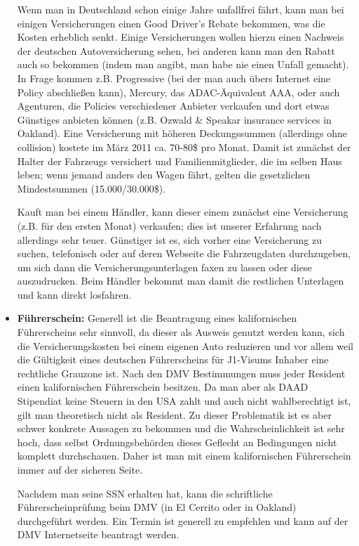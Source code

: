 \documentclass[a4paper]{scrreprt}
\begin{document}
\begin{itemize}
	Wenn man in Deutschland schon einige Jahre unfallfrei fährt, kann man bei einigen Versicherungen einen Good Driver's Rebate bekommen, was die Kosten erheblich senkt. Einige Versicherungen wollen hierzu einen Nachweis der deutschen Autoversicherung sehen, bei anderen kann man den Rabatt auch so bekommen (indem man angibt, man habe nie einen Unfall gemacht). In Frage kommen z.B. Progressive (bei der man auch übers Internet eine Policy abschließen kann), Mercury, das ADAC-Äquivalent AAA, oder auch Agenturen, die Policies verschiedener Anbieter verkaufen und dort etwas Günstiges anbieten können (z.B. Ozwald \& Speakar insurance services in Oakland). Eine Versicherung mit höheren Deckungssummen (allerdings ohne collision) kostete im März 2011 ca. 70-80\$ pro Monat. Damit ist zunächst der Halter der Fahrzeugs versichert und Familienmitglieder, die im selben Haus leben; wenn jemand anders den Wagen fährt, gelten die gesetzlichen Mindestsummen (15.000/30.000\$).
	
Kauft man bei einem Händler, kann dieser einem zunächst eine Versicherung (z.B. für den ersten Monat) verkaufen; dies ist unserer Erfahrung nach allerdings sehr teuer. Günstiger ist es, sich vorher eine Versicherung zu suchen, telefonisch oder auf deren Webseite die Fahrzeugdaten durchzugeben, um sich dann die Versicherungsunterlagen faxen zu lassen oder diese auszudrucken. Beim Händler bekommt man damit die restlichen Unterlagen und kann direkt losfahren.

	\item \textbf{Führerschein:} 
Generell ist die Beantragung eines kalifornischen Führerscheins sehr sinnvoll, da dieser als Ausweis genutzt werden kann, sich die Versicherungskosten bei einem eigenen Auto reduzieren und vor allem weil die Gültigkeit eines deutschen Führerscheins für J1-Visums Inhaber eine rechtliche Grauzone ist. Nach den DMV Bestimmungen muss jeder Resident einen kalifornischen Führerschein besitzen. Da man aber als DAAD Stipendiat keine Steuern in den USA zahlt und auch nicht wahlberechtigt ist, gilt man theoretisch nicht als Resident. Zu dieser Problematik ist es aber schwer konkrete Aussagen zu bekommen und die Wahrscheinlichkeit ist sehr hoch, dass selbst Ordnungsbehörden dieses Geflecht an Bedingungen nicht komplett durchschauen. Daher ist man mit einem kalifornischen Führerschein immer auf der sicheren Seite.

Nachdem man seine SSN erhalten hat, kann die schriftliche Führerscheinprüfung beim DMV (in El Cerrito oder in Oakland) durchgeführt werden. Ein Termin ist generell zu empfehlen und kann auf der DMV Internetseite beantragt werden. 


\end{itemize}
\end{document}
